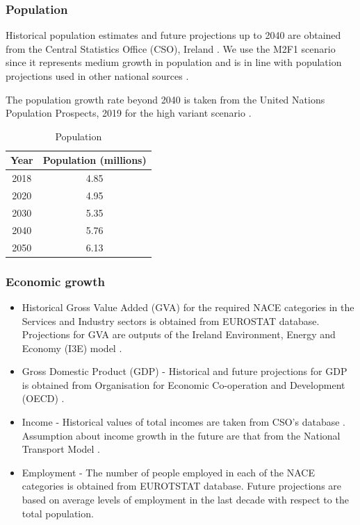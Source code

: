 \documentclass[journal abbreviation, manuscript]{copernicus}
\begin{document}
\subsubsection{Population}
Historical population estimates and future projections up to 2040 are obtained from the Central Statistics Office (CSO), Ireland \cite{CentralStatisticsOffice2020}. We use the M2F1 scenario since it represents medium growth in population and is in line with population projections used in other national sources \cite{Yakut2020}. 

The population growth rate beyond 2040 is taken from the United Nations Population Prospects, 2019 for the high variant scenario \cite{UnitedNations2019}.
\begin{table}[htbp]
 \centering
 \footnotesize
 \caption{Population}
 \begin{tabular}{cc}
 \hline
 Year & Population (millions) \\
 \hline
 2018 & 4.85 \\
 2020 & 4.95 \\
 2030 & 5.35 \\
 2040 & 5.76 \\
 2050 & 6.13 \\
 \hline
 \end{tabular}%
 \label{tab:pop}%
\end{table}%


\subsubsection{Economic growth}
\begin{itemize}
 \item Historical Gross Value Added (GVA) for the required NACE categories in the Services and Industry sectors is obtained from EUROSTAT database. Projections for GVA are outputs of the Ireland Environment, Energy and Economy (I3E) model \cite{Yakut2020}.
 \item Gross Domestic Product (GDP) - Historical and future projections for GDP is obtained from Organisation for Economic Co-operation and Development (OECD) \cite{OECD2018}. 
 \item Income - Historical values of total incomes are taken from CSO's database \cite{CSOincome}. Assumption about income growth in the future are that from the National Transport Model \cite{AECOMIrelandLimited2019}. 
 \item Employment - The number of people employed in each of the NACE categories is obtained from EUROTSTAT database. Future projections are based on average levels of employment in the last decade with respect to the total population. 
\end{itemize}
\end{document}
